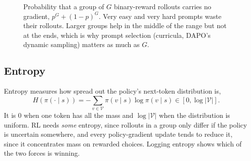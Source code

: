 \begin{figure}[ht]
\centering
{}
\caption{Probability that a group of $G$ binary-reward rollouts carries no gradient,
$p^G+(1-p)^G$. Very easy and very hard prompts waste their rollouts. Larger groups help in
the middle of the range but not at the ends, which is why prompt selection (curricula,
DAPO's dynamic sampling) matters as much as $G$.}
\label{fig:grpo2:zerovar}
\end{figure}

\subsection{Entropy}\label{sec:grpo2:entropy}

Entropy measures how spread out the policy's next-token distribution is,
\begin{equation}
H(\pi(\cdot\mid s))=-\sum_{v\in\mathcal V}\pi(v\mid s)\log\pi(v\mid s)\in[0,\log|\mathcal V|].
\end{equation}
It is 0 when one token has all the mass and $\log|\mathcal V|$ when the distribution is
uniform. RL needs \emph{some} entropy, since rollouts in a group only differ if the policy
is uncertain somewhere, and every policy-gradient update tends to reduce it, since it
concentrates mass on rewarded choices. Logging entropy shows which of the two forces is
winning.

